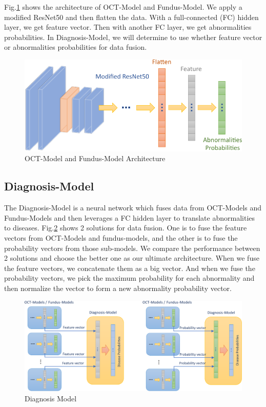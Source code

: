 \documentclass{article}
\begin{document}
		Fig.\ref{fig:resnet50} shows the architecture of OCT-Model and Fundus-Model.  We apply a modified ResNet50 and then flatten the data.  With a full-connected (FC) hidden layer, we get feature vector.  Then with another FC layer, we get abnormalities probabilities.  In Diagnosis-Model, we will determine to use whether feature vector or abnormalities probabilities for data fusion.
		
		\vspace{0.5cm}		
		
		\begin{figure}[htbp]
			\centering
			\includegraphics[width=0.6\linewidth]{ResNet50.pdf}
			\caption{OCT-Model and Fundus-Model Architecture}
			\label{fig:resnet50}
		\end{figure}
	
	\subsection{Diagnosis-Model}
		
		The Diagnosis-Model is a neural network which fuses data from OCT-Models and Fundus-Models and then leverages a FC hidden layer to translate abnormalities to diseases.
		Fig.\ref{fig:diagnosis-model} shows 2 solutions for data fusion.  One is to fuse the feature vectors from OCT-Models and fundus-models, and the other is to fuse the probability vectors from those sub-models.  We compare the performance between 2 solutions and choose the better one as our ultimate architecture.
		When we fuse the feature vectors, we concatenate them as a big vector.  And when we fuse the probability vectors, we pick the maximum probability for each abnormality and then normalize the vector to form a new abnormality probability vector.
		
		\vspace{0.5cm}		
		
		\begin{figure}[htbp]
			\centering
			\includegraphics[width=\linewidth]{Diagnosis-Model.pdf}
			\vspace{0.1cm}
			\caption{Diagnosis Model}
			\label{fig:diagnosis-model}
		\end{figure}
		
\end{document}
